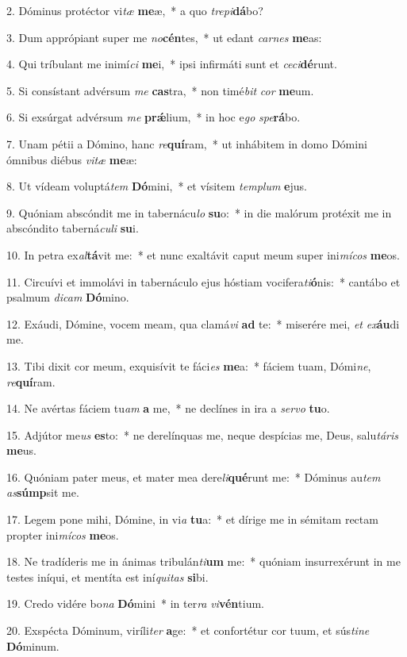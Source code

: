 2. Dóminus protéctor vi\textit{tæ} \textbf{me}æ,~*  a quo \textit{tre}\textit{pi}\textbf{dá}bo?\

3. Dum apprópiant super me \textit{no}\textbf{cén}tes,~*  ut edant \textit{car}\textit{nes} \textbf{me}as:\

4. Qui tríbulant me inimí\textit{ci} \textbf{me}i,~*  ipsi infirmáti sunt et \textit{ce}\textit{ci}\textbf{dé}runt.\

5. Si consístant advérsum \textit{me} \textbf{cas}tra,~*  non timé\textit{bit} \textit{cor} \textbf{me}um.\

6. Si exsúrgat advérsum \textit{me} \textbf{prǽ}lium,~*  in hoc e\textit{go} \textit{spe}\textbf{rá}bo.\

7. Unam pétii a Dómino, hanc \textit{re}\textbf{quí}ram,~*  ut inhábitem in domo Dómini ómnibus diébus \textit{vi}\textit{tæ} \textbf{me}æ:\

8. Ut vídeam voluptá\textit{tem} \textbf{Dó}mini,~*  et vísitem \textit{tem}\textit{plum} \textbf{e}jus.\

9. Quóniam abscóndit me in tabernácu\textit{lo} \textbf{su}o:~*  in die malórum protéxit me in abscóndito taberná\textit{cu}\textit{li} \textbf{su}i.\

10. In petra ex\textit{al}\textbf{tá}vit me:~*  et nunc exaltávit caput meum super ini\textit{mí}\textit{cos} \textbf{me}os.\

11. Circuívi et immolávi in tabernáculo ejus hóstiam vocifera\textit{ti}\textbf{ó}nis:~*  cantábo et psalmum \textit{di}\textit{cam} \textbf{Dó}mino.\

12. Exáudi, Dómine, vocem meam, qua clamá\textit{vi} \textbf{ad} te:~*  miserére mei, \textit{et} \textit{ex}\textbf{áu}di me.\

13. Tibi dixit cor meum, exquisívit te fáci\textit{es} \textbf{me}a:~*  fáciem tuam, Dómi\textit{ne}, \textit{re}\textbf{quí}ram.\

14. Ne avértas fáciem tu\textit{am} \textbf{a} me,~*  ne declínes in ira a \textit{ser}\textit{vo} \textbf{tu}o.\

15. Adjútor me\textit{us} \textbf{es}to:~*  ne derelínquas me, neque despícias me, Deus, salu\textit{tá}\textit{ris} \textbf{me}us.\

16. Quóniam pater meus, et mater mea dere\textit{li}\textbf{qué}runt me:~*  Dóminus au\textit{tem} \textit{as}\textbf{súmp}sit me.\

17. Legem pone mihi, Dómine, in vi\textit{a} \textbf{tu}a:~*  et dírige me in sémitam rectam propter ini\textit{mí}\textit{cos} \textbf{me}os.\

18. Ne tradíderis me in ánimas tribulán\textit{ti}\textbf{um} me:~*  quóniam insurrexérunt in me testes iníqui, et mentíta est iní\textit{qui}\textit{tas} \textbf{si}bi.\

19. Credo vidére bo\textit{na} \textbf{Dó}mini~*  in ter\textit{ra} \textit{vi}\textbf{vén}tium.\

20. Exspécta Dóminum, viríli\textit{ter} \textbf{a}ge:~*  et confortétur cor tuum, et sús\textit{ti}\textit{ne} \textbf{Dó}minum.\

